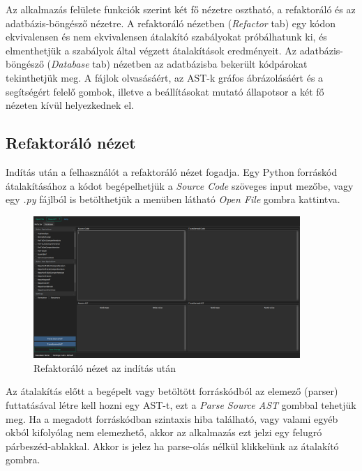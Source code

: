 Az alkalmazás felülete funkciók szerint két fő nézetre osztható, a refaktoráló és az adatbázis-böngésző nézetre.
A refaktoráló nézetben (\emph{Refactor} tab) egy kódon
ekvivalensen és nem ekvivalensen átalakító szabályokat próbálhatunk ki, és elmenthetjük
a szabályok által végzett átalakítások eredményeit.
Az adatbázis-böngésző (\emph{Database} tab) nézetben az adatbázisba bekerült kódpárokat tekinthetjük meg.
A fájlok olvasásáért, az AST-k gráfos ábrázolásáért és a segítségért felelő gombok, illetve a 
beállításokat mutató állapotsor a két fő nézeten kívül helyezkednek el.

\subsection{Refaktoráló nézet}

Indítás után a felhasználót a refaktoráló nézet fogadja.
Egy Python forráskód átalakításához a kódot begépelhetjük a \emph{Source Code} szöveges input mezőbe,
vagy egy \emph{.py} fájlból is betölthetjük a menüben látható \emph{Open File} gombra kattintva.

\begin{figure}[H]
	\centering
	\includegraphics[width=0.9\textwidth]{images/screenshots/refactor_tab_1.png}
	\caption{Refaktoráló nézet az indítás után}
\end{figure}

Az átalakítás előtt a begépelt vagy betöltött forráskódból az elemező (parser) futtatásával 
létre kell hozni egy AST-t, 
ezt a \emph{Parse Source AST} gombbal tehetjük meg. Ha a megadott forráskódban szintaxis hiba található, 
vagy valami egyéb okból kifolyólag nem elemezhető, akkor az alkalmazás ezt jelzi egy felugró 
párbeszéd-ablakkal. Akkor is jelez ha parse-olás nélkül klikkelünk az átalakító gombra.

